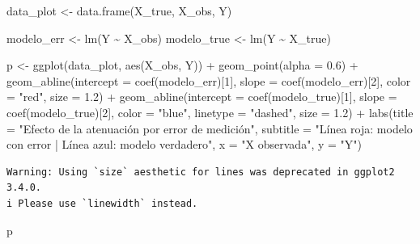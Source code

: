 \documentclass[
  spanish,
  letterpaper,
  DIV=11,
  numbers=noendperiod]{scrreprt}
\newenvironment{Shaded}{\begin{snugshade}}{\end{snugshade}}
\newcommand{\AttributeTok}[1]{\textcolor[rgb]{0.40,0.45,0.13}{#1}}
\newcommand{\DecValTok}[1]{\textcolor[rgb]{0.68,0.00,0.00}{#1}}
\newcommand{\FloatTok}[1]{\textcolor[rgb]{0.68,0.00,0.00}{#1}}
\newcommand{\FunctionTok}[1]{\textcolor[rgb]{0.28,0.35,0.67}{#1}}
\newcommand{\NormalTok}[1]{\textcolor[rgb]{0.00,0.23,0.31}{#1}}
\newcommand{\OtherTok}[1]{\textcolor[rgb]{0.00,0.23,0.31}{#1}}
\newcommand{\SpecialCharTok}[1]{\textcolor[rgb]{0.37,0.37,0.37}{#1}}
\newcommand{\StringTok}[1]{\textcolor[rgb]{0.13,0.47,0.30}{#1}}
\begin{document}
\begin{Shaded}
\begin{Highlighting}[]
\NormalTok{data\_plot }\OtherTok{\textless{}{-}} \FunctionTok{data.frame}\NormalTok{(X\_true, X\_obs, Y)}

\NormalTok{modelo\_err }\OtherTok{\textless{}{-}} \FunctionTok{lm}\NormalTok{(Y }\SpecialCharTok{\textasciitilde{}}\NormalTok{ X\_obs)}
\NormalTok{modelo\_true }\OtherTok{\textless{}{-}} \FunctionTok{lm}\NormalTok{(Y }\SpecialCharTok{\textasciitilde{}}\NormalTok{ X\_true)}

\NormalTok{p }\OtherTok{\textless{}{-}} \FunctionTok{ggplot}\NormalTok{(data\_plot, }\FunctionTok{aes}\NormalTok{(X\_obs, Y)) }\SpecialCharTok{+}
  \FunctionTok{geom\_point}\NormalTok{(}\AttributeTok{alpha =} \FloatTok{0.6}\NormalTok{) }\SpecialCharTok{+}
  \FunctionTok{geom\_abline}\NormalTok{(}\AttributeTok{intercept =} \FunctionTok{coef}\NormalTok{(modelo\_err)[}\DecValTok{1}\NormalTok{], }\AttributeTok{slope =} \FunctionTok{coef}\NormalTok{(modelo\_err)[}\DecValTok{2}\NormalTok{], }\AttributeTok{color =} \StringTok{"red"}\NormalTok{, }\AttributeTok{size =} \FloatTok{1.2}\NormalTok{) }\SpecialCharTok{+}
  \FunctionTok{geom\_abline}\NormalTok{(}\AttributeTok{intercept =} \FunctionTok{coef}\NormalTok{(modelo\_true)[}\DecValTok{1}\NormalTok{], }\AttributeTok{slope =} \FunctionTok{coef}\NormalTok{(modelo\_true)[}\DecValTok{2}\NormalTok{], }\AttributeTok{color =} \StringTok{"blue"}\NormalTok{, }\AttributeTok{linetype =} \StringTok{"dashed"}\NormalTok{, }\AttributeTok{size =} \FloatTok{1.2}\NormalTok{) }\SpecialCharTok{+}
  \FunctionTok{labs}\NormalTok{(}\AttributeTok{title =} \StringTok{"Efecto de la atenuación por error de medición"}\NormalTok{,}
       \AttributeTok{subtitle =} \StringTok{"Línea roja: modelo con error | Línea azul: modelo verdadero"}\NormalTok{,}
       \AttributeTok{x =} \StringTok{"X observada"}\NormalTok{, }\AttributeTok{y =} \StringTok{"Y"}\NormalTok{)}
\end{Highlighting}
\end{Shaded}

\begin{verbatim}
Warning: Using `size` aesthetic for lines was deprecated in ggplot2 3.4.0.
i Please use `linewidth` instead.
\end{verbatim}

\begin{Shaded}
\begin{Highlighting}[]
\NormalTok{p}
\end{Highlighting}
\end{Shaded}
\end{document}
